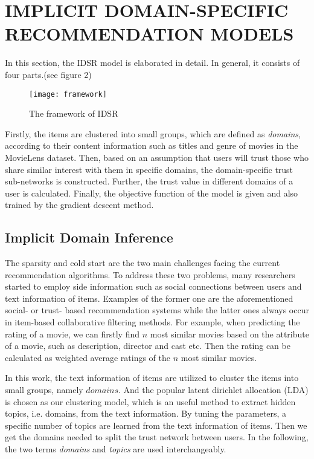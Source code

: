 \section{IMPLICIT DOMAIN-SPECIFIC RECOMMENDATION MODELS}
In this section, the IDSR model is elaborated in detail. In general, it consists of four parts.(see figure 2)
\begin{figure}[h]
	\caption{The framework of IDSR}
	\centering
	\texttt{[image: framework]}
\end{figure}
Firstly, the items are clustered into small groups, which are defined as \emph{domains}, according to their content information such as titles and genre of movies in the MovieLens dataset. Then, based on an assumption that users will trust those who share similar interest with them in specific domains, the domain-specific trust sub-networks is constructed. Further, the trust value in different domains of a user is calculated. Finally, the objective function of the model is given and also trained by the gradient descent method.
\subsection{Implicit Domain Inference}
The sparsity and cold start are the two main challenges facing the current recommendation algorithms. To address these two problems, many researchers started to employ side information such as social connections between users and text information of items. Examples of the former one are the aforementioned social- or trust- based recommendation systems while the latter ones always occur in item-based collaborative filtering methods. For example, when predicting the rating of a movie, we can firstly find $n$ most similar movies based on the attribute of a movie, such as description, director and cast etc. Then the rating can be calculated as weighted average ratings of the $n$ most similar movies.

In this work, the text information of items are utilized to cluster the items into small groups, namely $domains$. And the popular latent dirichlet allocation (LDA)\cite{blei2003latent} is chosen as our clustering model, which is an useful method to extract hidden topics, i.e. domains, from the text information. By tuning the parameters, a specific number of topics are learned from the text information of items. Then we get the domains needed to split the trust network between users. In the following, the two terms \textit{domains} and \textit{topics} are used interchangeably.

